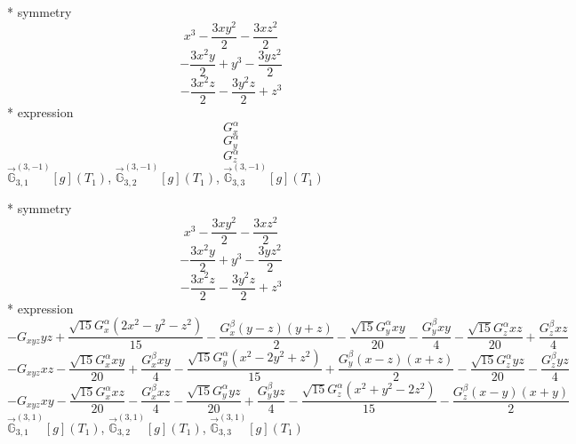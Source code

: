 \documentclass[fleqn,8pt]{jsarticle}
\begin{document}
\noindent\quad ** symmetry
\begin{dmath*}
x^{3} - \frac{3 x y^{2}}{2} - \frac{3 x z^{2}}{2}
\end{dmath*}
\begin{dmath*}
- \frac{3 x^{2} y}{2} + y^{3} - \frac{3 y z^{2}}{2}
\end{dmath*}
\begin{dmath*}
- \frac{3 x^{2} z}{2} - \frac{3 y^{2} z}{2} + z^{3}
\end{dmath*}
\noindent\quad ** expression
\begin{dmath*}
G_{x}^{\alpha}
\end{dmath*}
\begin{dmath*}
G_{y}^{\alpha}
\end{dmath*}
\begin{dmath*}
G_{z}^{\alpha}
\end{dmath*}
\noindent\quad $\vec{\mathbb{G}}_{3,1}^{(3,-1)}[g](T_{1})$, $\vec{\mathbb{G}}_{3,2}^{(3,-1)}[g](T_{1})$, $\vec{\mathbb{G}}_{3,3}^{(3,-1)}[g](T_{1})$

\noindent\quad ** symmetry
\begin{dmath*}
x^{3} - \frac{3 x y^{2}}{2} - \frac{3 x z^{2}}{2}
\end{dmath*}
\begin{dmath*}
- \frac{3 x^{2} y}{2} + y^{3} - \frac{3 y z^{2}}{2}
\end{dmath*}
\begin{dmath*}
- \frac{3 x^{2} z}{2} - \frac{3 y^{2} z}{2} + z^{3}
\end{dmath*}
\noindent\quad ** expression
\begin{dmath*}
- G_{xyz} y z + \frac{\sqrt{15} G_{x}^{\alpha} \left(2 x^{2} - y^{2} - z^{2}\right)}{15} - \frac{G_{x}^{\beta} \left(y - z\right) \left(y + z\right)}{2} - \frac{\sqrt{15} G_{y}^{\alpha} x y}{20} - \frac{G_{y}^{\beta} x y}{4} - \frac{\sqrt{15} G_{z}^{\alpha} x z}{20} + \frac{G_{z}^{\beta} x z}{4}
\end{dmath*}
\begin{dmath*}
- G_{xyz} x z - \frac{\sqrt{15} G_{x}^{\alpha} x y}{20} + \frac{G_{x}^{\beta} x y}{4} - \frac{\sqrt{15} G_{y}^{\alpha} \left(x^{2} - 2 y^{2} + z^{2}\right)}{15} + \frac{G_{y}^{\beta} \left(x - z\right) \left(x + z\right)}{2} - \frac{\sqrt{15} G_{z}^{\alpha} y z}{20} - \frac{G_{z}^{\beta} y z}{4}
\end{dmath*}
\begin{dmath*}
- G_{xyz} x y - \frac{\sqrt{15} G_{x}^{\alpha} x z}{20} - \frac{G_{x}^{\beta} x z}{4} - \frac{\sqrt{15} G_{y}^{\alpha} y z}{20} + \frac{G_{y}^{\beta} y z}{4} - \frac{\sqrt{15} G_{z}^{\alpha} \left(x^{2} + y^{2} - 2 z^{2}\right)}{15} - \frac{G_{z}^{\beta} \left(x - y\right) \left(x + y\right)}{2}
\end{dmath*}
\noindent\quad $\vec{\mathbb{G}}_{3,1}^{(3,1)}[g](T_{1})$, $\vec{\mathbb{G}}_{3,2}^{(3,1)}[g](T_{1})$, $\vec{\mathbb{G}}_{3,3}^{(3,1)}[g](T_{1})$
\end{document}
